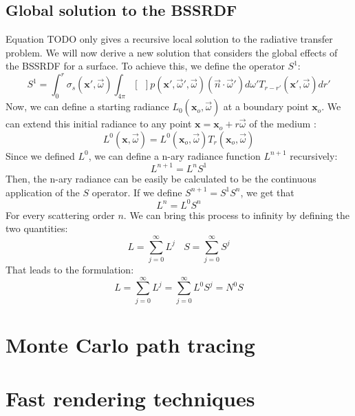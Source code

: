 \subsection{Global solution to the BSSRDF}
Equation TODO only gives a recursive local solution to the radiative transfer problem. We will now derive a new solution that considers the global effects of the BSSRDF for a surface.  To achieve this, we define the operator $S^1$:
$$
S^1 = \int_0^r \sigma_s(\mathbf{x}', \vec{\omega}) \int_{4\pi} [\ \ ] p(\mathbf{x}', \vec{\omega}', \vec{\omega})  (\vec{n} \cdot \vec{\omega}')  d\omega' T_{r-r'}(\mathbf{x}', \vec{\omega})  dr'
$$
Now, we can define a starting radiance $L_0(\mathbf{x}_o, \vec{\omega})$ at a boundary point $\mathbf{x}_o$. We can extend this initial radiance to any point $\mathbf{x} = \mathbf{x}_o + r \vec{\omega}$ of the medium :
$$
L^0(\mathbf{x}, \vec{\omega}) = L^0(\mathbf{x}_o, \vec{\omega}) T_r(\mathbf{x}_o, \vec{\omega})
$$
Since we defined $L^0$, we can define a n-ary radiance function $L^{n+1}$ recursively:
$$
L^{n+1} = L^n S^1
$$
Then, the n-ary radiance can be easily be calculated to be the continuous application of the $S$ operator. If we define $S^{n+1} = S^1 S^n$, we get that 
$$
L^n = L^0 S^n
$$
For every scattering order $n$.
We can bring this process to infinity by defining the two quantities:
$$
L = \sum_{j=0}^\infty L^j\ \ \ \ S = \sum_{j=0}^\infty S^j
$$
That leads to the formulation:
$$
L =  \sum_{j=0}^\infty L^j = \sum_{j=0}^\infty L^0 S^j = N^0 S
$$

\section{Monte Carlo path tracing}

\section{Fast rendering techniques} 

